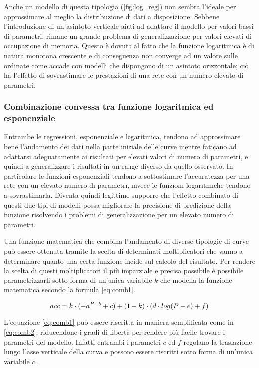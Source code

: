 Anche un modello di questa tipologia (\ref{fig:log_reg}) non sembra l'ideale per approssimare al meglio la distribuzione di dati a disposizione. Sebbene l'introduzione di un asintoto verticale aiuti ad adattare il modello per valori bassi di parametri, rimane un grande problema di generalizzazione per valori elevati di occupazione di memoria. Questo è dovuto al fatto che la funzione logaritmica è di natura monotona crescente e di conseguenza non converge ad un valore sulle ordinate come accade con modelli che dispongono di un asintoto orizzontale; ciò ha l'effetto di sovrastimare le prestazioni di una rete con un numero elevato di parametri.

\subsubsection{Combinazione convessa tra funzione logaritmica ed esponenziale}

Entrambe le regressioni, esponenziale e logaritmica, tendono ad approssimare bene l'andamento dei dati nella parte iniziale delle curve mentre faticano ad adattarsi adeguatamente ai risultati per elevati valori di numero di parametri, e quindi a generalizzare i risultati in un range diverso da quello osservato. In particolare le funzioni esponenziali tendono a sottostimare l'accuratezza per una rete con un elevato numero di parametri, invece le funzioni logaritmiche tendono a sovrastimarla. 
Diventa quindi legittimo supporre che l'effetto combinato di questi due tipi di modelli possa migliorare la precisione di predizione della funzione risolvendo i problemi di generalizzazione per un elevato numero di parametri.

Una funzione matematica che combina l'andamento di diverse tipologie di curve può essere ottenuta tramite la scelta di determinati moltiplicatori che vanno a determinare quanto una certa funzione incide sul calcolo del risultato. Per rendere la scelta di questi moltiplicatori il più imparziale e precisa possibile è possibile parametrizzarli sotto forma di un'unica variabile $k$ che modella la funzione matematica secondo la formula \ref{eq:comb1}.

\begin{equation}
\label{eq:comb1}
    \centering
    acc = k \cdot (-a^{P - b} + c) + (1 - k) \cdot (d \cdot log(P - e) + f)
\end{equation}

L'equazione \ref{eq:comb1} può essere riscritta in maniera semplificata come in \ref{eq:comb2}, riducendone i gradi di libertà per rendere più facile trovare i parametri del modello. Infatti entrambi i parametri $c$ ed $f$ regolano la traslazione lungo l'asse verticale della curva e possono essere riscritti sotto forma di un'unica variabile $c$.

